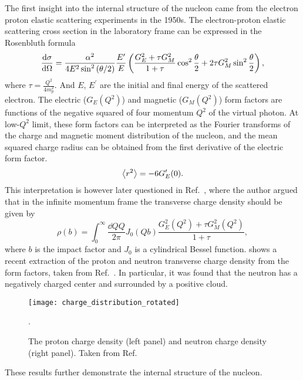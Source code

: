 \documentclass[../main.tex]{subfiles}
\begin{document}
The first insight into the internal structure of the nucleon came from the
electron proton elastic scattering experiments \cite{hofstadter1956} in the
1950s. The electron-proton elastic scattering cross section in the laboratory
frame can be expressed in the Rosenbluth formula \cite{rosenbluth1950}
\begin{equation}
	\dv{\sigma}{\Omega} = \frac{\alpha^2}{4E^2 \sin^2\left(\theta/2\right)}
	\frac{E^\prime}{E} \left( \frac{G_E^2+\tau G_M^2}{1+\tau} \cos^2
	\frac{\theta}{2} + 2\tau G_M^2 \sin^2 \frac{\theta}{2}\right)
	\label{eq:ep_cs},
\end{equation}
where $\tau = \frac{Q^2}{4m_p^2}$.
And $E$, $E^\prime$ are the initial and final energy of the scattered electron.
The electric ($G_E\left(Q^2\right)$) and magnetic ($G_M\left(Q^2\right)$) form
factors are functions of the negative squared of four momentum $Q^2$ of the virtual photon. At
low-$Q^2$ limit, these form factors can be interpreted as the Fourier transforms
of the charge and magnetic moment distribution of the nucleon, and the mean squared
charge radius can be obtained from the first derivative of the electric form factor.
\begin{equation}
	\expval{r^2}=-6G^\prime_E(0).
\end{equation}
This interpretation is however later questioned in Ref.~\cite{miller2007,miller2019},
where the author argued that in the infinite momentum frame the transverse charge
density should be given by
\begin{equation}
	\rho(b)=\int^\infty_0 \frac{\dd{Q}Q}{2\pi} J_0(Qb)\frac{G_E^2(Q^2)+\tau G_M^2(Q^2)}{1+\tau},
\end{equation}
where $b$ is the impact factor and $J_0$ is a cylindrical Bessel function.
shows a recent extraction of the proton and neutron transverse charge density from the
form factors, taken from Ref.~\cite{miller2007}. In particular, it was found that
the neutron has a negatively charged center and surrounded by a positive cloud.
\begin{figure}[htbp!]
	\centering
	\texttt{[image: charge\_distribution\_rotated]}
	\caption{The proton charge density (left panel) and neutron charge density
		(right panel). Taken from Ref.~\cite{miller2007}}.
	\label{fig:charge}
\end{figure}
These results further demonstrate the internal structure of the nucleon.
\end{document}
